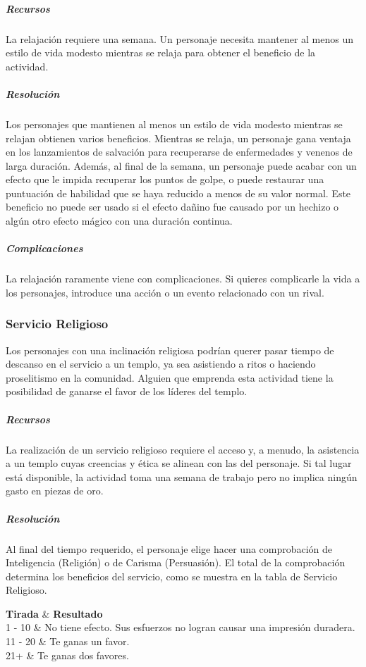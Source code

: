 \documentclass[a4paper,twocolumn,openany,10pt]{dndbook}
\begin{document}
\subparagraph{Recursos} La relajación requiere una semana. Un personaje necesita mantener al menos un estilo de vida modesto
mientras se relaja para obtener el beneficio de la actividad.

\subparagraph{Resolución} Los personajes que mantienen al menos un estilo de vida modesto mientras se relajan obtienen varios
beneficios. Mientras se relaja, un personaje gana ventaja en los lanzamientos de salvación para recuperarse de enfermedades y
venenos de larga duración. Además, al final de la semana, un personaje puede acabar con un efecto que le impida recuperar los
puntos de golpe, o puede restaurar una puntuación de habilidad que se haya reducido a menos de su valor normal. Este beneficio
no puede ser usado si el efecto dañino fue causado por un hechizo o algún otro efecto mágico con una duración continua.

\subparagraph{Complicaciones} La relajación raramente viene con complicaciones. Si quieres complicarle la vida a los personajes,
introduce una acción o un evento relacionado con un rival. 

\subsubsection{Servicio Religioso}
Los personajes con una inclinación religiosa podrían querer pasar tiempo de descanso en el servicio a un templo, ya sea
asistiendo a ritos o haciendo proselitismo en la comunidad. Alguien que emprenda esta actividad tiene la posibilidad de ganarse
el favor de los líderes del templo.

\subparagraph{Recursos} La realización de un servicio religioso requiere el acceso y, a menudo, la asistencia a un templo cuyas
creencias y ética se alinean con las del personaje. Si tal lugar está disponible, la actividad toma una semana de trabajo pero
no implica ningún gasto en piezas de oro.

\subparagraph{Resolución} Al final del tiempo requerido, el personaje elige hacer una comprobación de Inteligencia (Religión) o
de Carisma (Persuasión). El total de la comprobación determina los beneficios del servicio, como se muestra en la tabla de
Servicio Religioso.

\begin{dndtable}[cX]
	\textbf{Tirada}	& \textbf{Resultado}	\\
	 1 - 10			& No tiene efecto. Sus esfuerzos no logran causar una impresión duradera.	\\
	11 - 20			& Te ganas un favor.	\\
	21+				& Te ganas dos favores.	\\
\end{dndtable}
\end{document}
